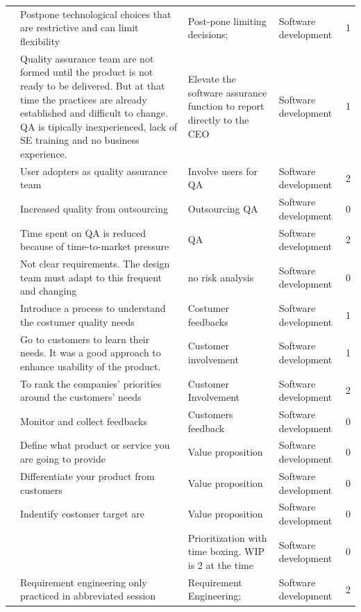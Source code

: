 \documentclass[final,5p,times,twocolumn]{elsarticle}
\begin{document}
\begin{center}
\begin{longtable}{|p{0.4in}|p{3in}|p{1.3in}|p{1in}|p{0.3in}|}
\cite{Midler2008} & Postpone technological choices that are restrictive and can limit flexibility & Post-pone limiting decisions; & Software development & 1 \\
\cite{Mater2000} & Quality assurance team are not formed until the product is not ready to be delivered. But at that time the practices are already established and difficult to change. QA is tipically inexperienced, lack of SE training and no business experience. & Elevate the software assurance function to report directly to the CEO & Software development & 1 \\
\cite{Yoffie1999} & User adopters as quality assurance team & Involve users for QA & Software development & 2 \\
\cite{Mater2000} & Increased quality from outsourcing & Outsourcing QA & Software development & 0 \\
\cite{Zettel2001} & Time spent on QA is reduced because of time-to-market pressure & QA    & Software development & 2 \\
\cite{Tanabian2005} & Not clear requirements. The design team must adapt to this frequent and changing & no risk analysis & Software development & 0 \\
\cite{Mater2000} & Introduce a process to understand the costumer quality needs & Costumer feedbacks & Software development & 1 \\
\cite{Mirel2000} & Go to customers to learn their needs. It was a good approach to enhance usability of the product. & Customer involvement & Software development & 1 \\
\cite{Wall2001} & To rank the companies' priorities around the customers' needs & Customer Involvement & Software development & 2 \\
\cite{Su-Chan2007} & Monitor and collect feedbacks & Customers feedback & Software development & 0 \\
\cite{Su-Chan2007} & Define what product or service you are going to provide & Value proposition & Software development & 0 \\
\cite{Su-Chan2007} & Differentiate your product from customers & Value proposition & Software development & 0 \\
\cite{Su-Chan2007} & Indentify costomer target are & Value proposition & Software development & 0 \\
\cite{Taipale2010} &       & Prioritization with time boxing. WIP is 2 at the time & Software development & 0 \\
\cite{Zettel2001} & Requirement engineering only practiced in abbreviated session & Requirement Engineering; & Software development & 2 \\

\end{longtable}
\end{center}
\end{document}

